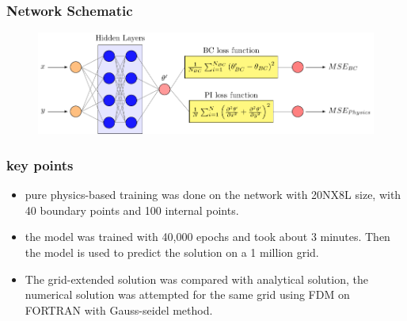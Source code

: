 
\begin{frame}
    \frametitle{Network Schematic}
    \begin{figure}
        \centering
        \includegraphics[scale=0.77]{00_schematic/02_PINN_schematic/PINN_HC_schematic.pdf}
    \end{figure}
\end{frame}


\begin{frame}
    \frametitle{key points}

    \begin{itemize}
        \item pure physics-based training was done on the network with 20NX8L size,
            with 40 boundary points and 100 internal points.
            \vspace{1cm}
        \item the model was trained with 40,000 epochs and took about 3 minutes.
            Then the model is used to predict the solution on a 1 million grid.
            \vspace{1cm}
        \item The grid-extended solution was compared with analytical solution,
            the numerical solution was attempted for the same grid using FDM on
            FORTRAN with Gauss-seidel method.
    \end{itemize}
\end{frame}


